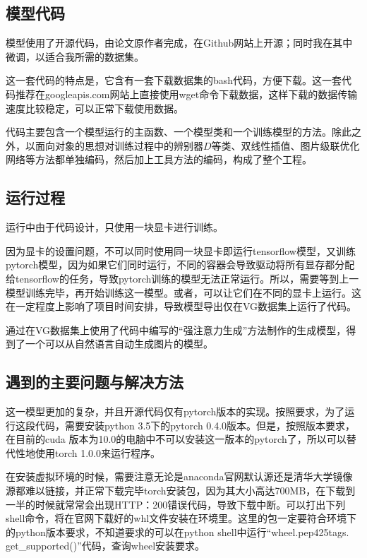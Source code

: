 \subsection{模型代码}
模型使用了开源代码，由论文原作者完成，在Github网站上开源；同时我在其中微调，以适合我所需的数据集。

这一套代码的特点是，它含有一套下载数据集的bash代码，方便下载。这一套代码推荐在googleapis.com网站上直接使用wget命令下载数据，这样下载的数据传输速度比较稳定，可以正常下载使用数据。

代码主要包含一个模型运行的主函数、一个模型类和一个训练模型的方法。除此之外，以面向对象的思想对训练过程中的辨别器$D$等类、双线性插值、图片级联优化网络等方法都单独编码，然后加上工具方法的编码，构成了整个工程。

\subsection{运行过程}
运行中由于代码设计，只使用一块显卡进行训练。

因为显卡的设置问题，不可以同时使用同一块显卡即运行tensorflow模型，又训练pytorch模型，因为如果它们同时运行，不同的容器会导致驱动将所有显存都分配给tensorflow的任务，导致pytorch训练的模型无法正常运行。所以，需要等到上一模型训练完毕，再开始训练这一模型。或者，可以让它们在不同的显卡上运行。这在一定程度上影响了项目时间安排，导致模型导出仅在VG数据集上运行了代码。

通过在VG数据集上使用了代码中编写的“强注意力生成”方法制作的生成模型，得到了一个可以从自然语言自动生成图片的模型。

\subsection{遇到的主要问题与解决方法}
这一模型更加的复杂，并且开源代码仅有pytorch版本的实现。按照要求，为了运行这段代码，需要安装python 3.5下的pytorch 0.4.0版本。但是，按照版本要求，在目前的cuda 版本为10.0的电脑中不可以安装这一版本的pytorch了，所以可以替代性地使用torch 1.0.0来运行程序。

在安装虚拟环境的时候，需要注意无论是anaconda官网默认源还是清华大学镜像源都难以链接，并正常下载完毕torch安装包，因为其大小高达700MB，在下载到一半的时候就常常会出现HTTP：200错误代码，导致下载中断。可以打出下列shell命令，将在官网下载好的whl文件安装在环境里。这里的包一定要符合环境下的python版本要求，不知道要求的可以在python shell中运行“wheel.pep425tags. get\_supported()”代码，查询wheel安装要求。


